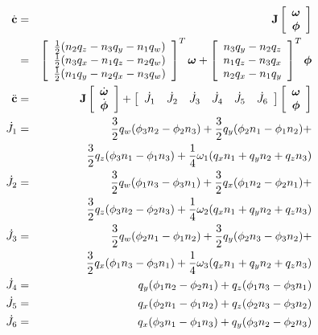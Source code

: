 \begin{eqnarray}
\dot{\ve{c}} &=& \m{J}\left[\begin{array}{c} \ve{\omega}\\\ve{\phi} \end{array}\right] \\
&=& \left[\begin{array}{c}
        \frac{1}{2}( n_2 q_z - n_3 q_y - n_1 q_w) \\
        \frac{1}{2}( n_3 q_x - n_1 q_z - n_2 q_w) \\
        \frac{1}{2}( n_1 q_y - n_2 q_x - n_3 q_w)
    \end{array}\right]^T \ve{\omega} +
    \left[\begin{array}{c}
        n_3 q_y - n_2 q_z \\ n_1 q_z - n_3 q_x \\ n_2 q_x - n_1 q_y
    \end{array}\right]^T \ve{\phi} \nonumber \\
\ddot{\ve{c}} &=& \m{J}
    \left[\begin{array}{c} \dot{\ve{\omega}}\\\dot{\ve{\phi}} \end{array}\right] +
    \left[\begin{array}{cccccc} \dot{J}_1 & \dot{J}_2 & \dot{J}_3 & \dot{J}_4 &
        \dot{J}_5 & \dot{J}_6 \end{array}\right]
    \left[\begin{array}{c} \ve{\omega}\\\ve{\phi} \end{array}\right] \\
\dot{J}_1 & = & \frac{3}{2} q_w (\phi_3 n_2 - \phi_2 n_3) +
                \frac{3}{2} q_y (\phi_2 n_1 - \phi_1 n_2) + \nonumber\\*&&
                \frac{3}{2} q_z (\phi_3 n_1 - \phi_1 n_3) +
                \frac{1}{4} \omega_1 (q_x n_1 + q_y n_2 + q_z n_3) \nonumber\\
\dot{J}_2 & = & \frac{3}{2} q_w (\phi_1 n_3 - \phi_3 n_1) +
                \frac{3}{2} q_x (\phi_1 n_2 - \phi_2 n_1) + \nonumber\\*&&
                \frac{3}{2} q_z (\phi_3 n_2 - \phi_2 n_3) +
                \frac{1}{4} \omega_2 (q_x n_1 + q_y n_2 + q_z n_3) \nonumber\\
\dot{J}_3 & = & \frac{3}{2} q_w (\phi_2 n_1 - \phi_1 n_2) +
                \frac{3}{2} q_y (\phi_2 n_3 - \phi_3 n_2) + \nonumber\\*&&
                \frac{3}{2} q_x (\phi_1 n_3 - \phi_3 n_1) +
                \frac{1}{4} \omega_3 (q_x n_1 + q_y n_2 + q_z n_3) \nonumber\\
\dot{J}_4 & = & q_y (\phi_1 n_2 - \phi_2 n_1) + q_z (\phi_1 n_3 - \phi_3 n_1) \nonumber\\
\dot{J}_5 & = & q_x (\phi_2 n_1 - \phi_1 n_2) + q_z (\phi_2 n_3 - \phi_3 n_2) \nonumber\\
\dot{J}_6 & = & q_x (\phi_3 n_1 - \phi_1 n_3) + q_y (\phi_3 n_2 - \phi_2 n_3) \nonumber
\end{eqnarray}
